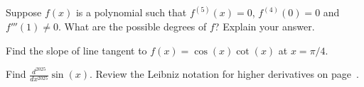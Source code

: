 \documentclass[../main.tex]{subfiles}
\begin{document}
\begin{example}
  Suppose \(f(x)\) is a polynomial such that \(f^{(5)}(x) = 0\), \(f^{(4)}(0) = 0\) and \(f'''(1) \ne 0\). What are the possible degrees of \(f\)? Explain your answer.

\end{example}
\clearpage

\begin{example}
  Find the slope of line tangent to \(f(x) = \cos(x)\cot(x)\) at \(x = \pi/4\). 

\end{example}

\begin{example}
  Find \(\frac{d^{2025}}{dx^{2025}} \sin(x)\). Review the Leibniz notation for higher derivatives on page~\pageref{page:higher-derivatives}.

\end{example}
\end{document}
